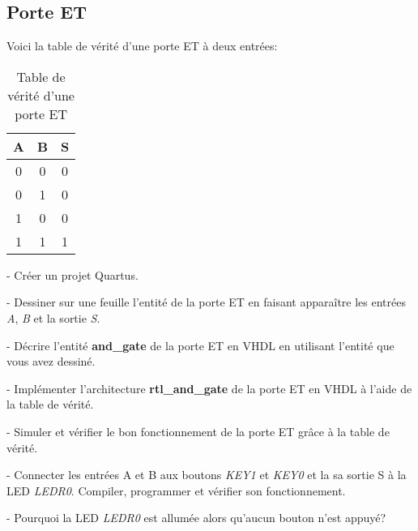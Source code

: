 \subsection{Porte ET}
Voici la table de vérité d'une porte ET à deux entrées:
\begin{table}[ht]
    \centering
    \begin{tabular}{c c|c} 
        A & B & S \\
        \hline
        0 & 0 & 0 \\
        0 & 1 & 0 \\
        1 & 0 & 0 \\
        1 & 1 & 1
    \end{tabular}
    \caption{Table de vérité d'une porte ET}
\end{table}

- Créer un projet Quartus.

\medskip

- Dessiner sur une feuille l'entité de la porte ET en faisant apparaître les entrées \textit{A}, \textit{B} et la sortie \textit{S}.

\medskip

- Décrire l'entité \textbf{and\_gate} de la porte ET en VHDL en utilisant l'entité que vous avez dessiné.

\medskip

- Implémenter l'architecture \textbf{rtl\_and\_gate} de la porte ET en VHDL à l'aide de la table de vérité.

\medskip

- Simuler et vérifier le bon fonctionnement de la porte ET grâce à la table de vérité.

\medskip

- Connecter les entrées A et B aux boutons \textit{KEY1} et \textit{KEY0} et la sa sortie S à la LED \textit{LEDR0}. Compiler, programmer et vérifier son fonctionnement. 

\medskip

- Pourquoi la LED \textit{LEDR0} est allumée alors qu'aucun bouton n'est appuyé?